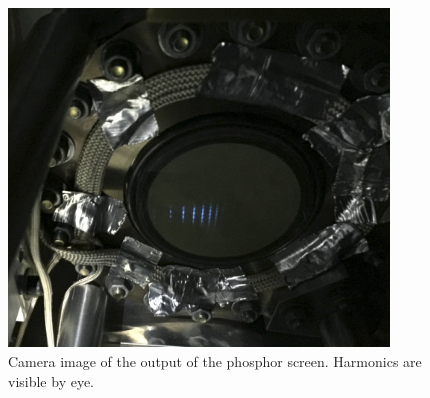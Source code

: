 \begin{figure}
	\centering
	\includegraphics[width=0.9\textwidth]{figures/Two_source/MCP_ts_harmonics.png}
	\caption{Camera image of the output of the phosphor screen.  Harmonics are visible by eye.}
	\label{MCP_ts_harmonics}
\end{figure}


